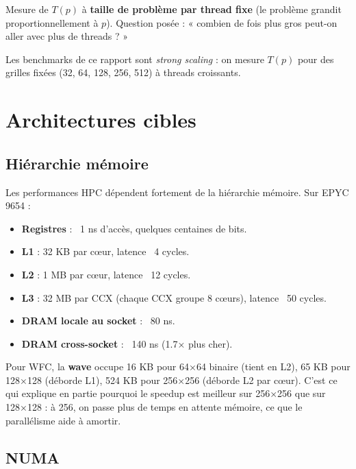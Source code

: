 \begin{definition}
Mesure de $T(p)$ à \textbf{taille de problème par thread fixe} (le problème grandit proportionnellement à $p$). Question posée : « combien de fois plus gros peut-on aller avec plus de threads ? »
\end{definition}

Les benchmarks de ce rapport sont \textit{strong scaling} : on mesure $T(p)$ pour des grilles fixées (32, 64, 128, 256, 512) à threads croissants.

\section{Architectures cibles}
\label{sec:prelim:archi}

\subsection{Hiérarchie mémoire}

Les performances HPC dépendent fortement de la hiérarchie mémoire. Sur EPYC 9654 :
\begin{itemize}
    \item \textbf{Registres} : ~1 ns d'accès, quelques centaines de bits.
    \item \textbf{L1} : 32 KB par cœur, latence ~4 cycles.
    \item \textbf{L2} : 1 MB par cœur, latence ~12 cycles.
    \item \textbf{L3} : 32 MB par CCX (chaque CCX groupe 8 cœurs), latence ~50 cycles.
    \item \textbf{DRAM locale au socket} : ~80 ns.
    \item \textbf{DRAM cross-socket} : ~140 ns (1.7× plus cher).
\end{itemize}

Pour WFC, la \textbf{wave} occupe 16 KB pour 64×64 binaire (tient en L2), 65 KB pour 128×128 (déborde L1), 524 KB pour 256×256 (déborde L2 par cœur). C'est ce qui explique en partie pourquoi le speedup est meilleur sur 256×256 que sur 128×128 : à 256, on passe plus de temps en attente mémoire, ce que le parallélisme aide à amortir.

\subsection{NUMA}

